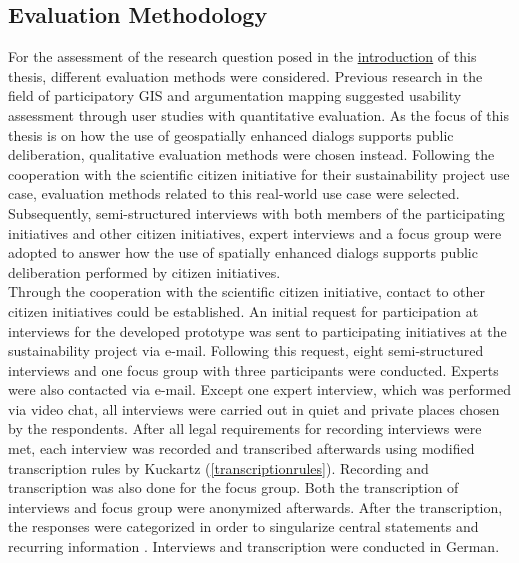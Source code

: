 \subsection{Evaluation Methodology}
\label{subchap:ev_methodology}
For the assessment of the research question posed in the \hyperref[chap:introduction]{introduction} of this thesis, different evaluation methods were considered. Previous research in the field of participatory GIS and argumentation mapping suggested usability assessment through user studies with quantitative evaluation. As the focus of this thesis is on how the use of geospatially enhanced dialogs supports public deliberation, qualitative evaluation methods were chosen instead. Following the cooperation with the scientific citizen initiative for their sustainability project use case, evaluation methods related to this real-world use case were selected. Subsequently, semi-structured interviews with both members of the participating initiatives and other citizen initiatives, expert interviews and a focus group were adopted to answer how the use of spatially enhanced dialogs supports public deliberation performed by citizen initiatives.\\
Through the cooperation with the scientific citizen initiative, contact to other citizen initiatives could be established. An initial request for participation at interviews for the developed prototype was sent to participating initiatives at the sustainability project via e-mail. Following this request, eight semi-structured interviews and one focus group with three participants were conducted. Experts were also contacted via e-mail. Except one expert interview, which was performed via video chat, all interviews were carried out in quiet and private places chosen by the respondents. After all legal requirements for recording interviews were met, each interview was recorded and transcribed afterwards using modified transcription rules by Kuckartz \cite{kuckartz2007} (\ref{transcriptionrules}). Recording and transcription was also done for the focus group. Both the transcription of interviews and focus group were anonymized afterwards. After the transcription, the responses were categorized in order to singularize central statements and recurring information \cite{naderer2007auswertung}. Interviews and transcription were conducted in German.

